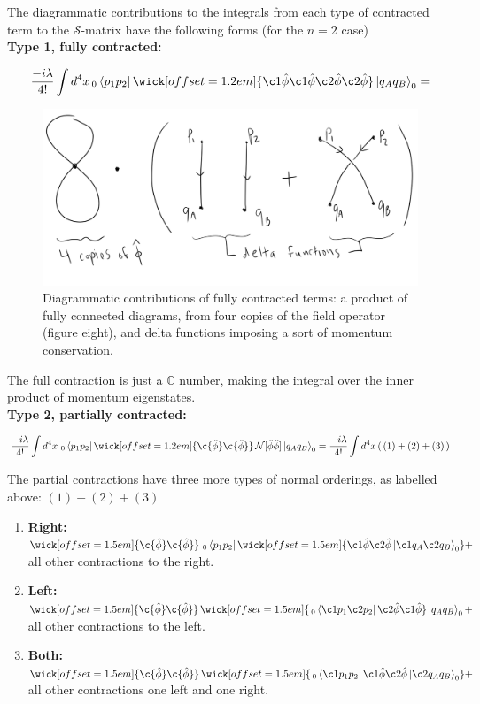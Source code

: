 \noindent The diagrammatic contributions to the integrals from each type of contracted term to the $\mathcal{S}$-matrix have the following forms (for the $n=2$ case) \\

\noindent \textbf{Type 1, fully contracted:} 

\begin{equation}
\frac{-i\lambda}{4!} \int d^4 x \,_0 \bra{p_1 p_2} \wick[offset=1.2em]{\c1 {\hat{\phi}} \c1 {\hat{\phi}} \c2 {\hat{\phi}} \c2 {\hat{\phi}} } \ket{q_A q_B}_0 =
\end{equation}
\begin{figure}[H]
	\centering
	\includegraphics[scale=0.4]{fullcont.png}
	\caption{Diagrammatic contributions of fully contracted terms: a product of fully connected diagrams, from four copies of the field operator (figure eight), and delta functions imposing a sort of momentum conservation.}
\end{figure}

\noindent The full contraction is just a $\mathbb{C}$ number, making the integral over the inner product of momentum eigenstates. \\

\noindent \textbf{Type 2, partially contracted:}

\begin{equation}
\frac{-i\lambda}{4!} \int d^4 x \,\,_0\bra{p_1 p_2} \wick[offset=1.2em]{\c {\hat{\phi}} \c {\hat{\phi}}} \,\mathcal{N}[\hat{\phi} \hat{\phi}] \ket{q_A q_B}_0 = \frac{-i\lambda}{4!} \int d^4 x \, ( \, (1) + (2) + (3) \, )
\end{equation}

\noindent The partial contractions have three more types of normal orderings, as labelled above: $(1) + (2) + (3)$
\begin{enumerate}
\item \textbf{Right:} $\wick[offset=1.5em]{\c {\hat{\phi}} \c {\hat{\phi}}} \,\,_0\bra{p_1 p_2} \wick[offset=1.5em]{\c1 {\hat{\phi}} \c2 {\hat{\phi}} \ket{ \c1 {q_A} \c2{q_B} }_0 } + $ all other contractions to the right.
\item \textbf{Left:} $\wick[offset=1.5em]{\c {\hat{\phi}} \c {\hat{\phi}}} \, \wick[offset=1.5em]{ \,_0\bra{ \c1 {p_1} \c2 {p_2} } \c2 {\hat{\phi}} \c1 {\hat{\phi}}} \ket{q_A q_B}_0  + $ all other contractions to the left.
\item \textbf{Both:} $\wick[offset=1.5em]{\c {\hat{\phi}} \c {\hat{\phi}}} \, \wick[offset=1.5em]{ \,_0\bra{ \c1 {p_1} p_2} \c1 {\hat{\phi}} \c2 {\hat{\phi}} \ket{ \c2 {q_A} q_B }_0 } + $ all other contractions one left and one right.
\end{enumerate}

